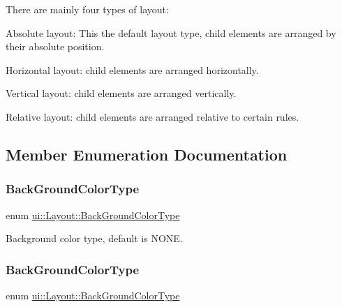 There are mainly four types of layout\+:
\begin{DoxyItemize}
\item Absolute layout\+: This the default layout type, child elements are arranged by their absolute position.
\item Horizontal layout\+: child elements are arranged horizontally.
\item Vertical layout\+: child elements are arranged vertically.
\item Relative layout\+: child elements are arranged relative to certain rules. 
\end{DoxyItemize}

\subsection{Member Enumeration Documentation}
\mbox{\label{classui_1_1Layout_a2aad69f15823c5f22d8ed72bf2ac7472}} 
\subsubsection{\texorpdfstring{Back\+Ground\+Color\+Type}{BackGroundColorType}\hspace{0.1cm}{\footnotesize\ttfamily [1/2]}}
{\footnotesize\ttfamily enum \hyperlink{classui_1_1Layout_a2aad69f15823c5f22d8ed72bf2ac7472}{ui\+::\+Layout\+::\+Back\+Ground\+Color\+Type}\hspace{0.3cm}{\ttfamily [strong]}}

Background color type, default is N\+O\+NE. \mbox{\label{classui_1_1Layout_a2aad69f15823c5f22d8ed72bf2ac7472}} 
\subsubsection{\texorpdfstring{Back\+Ground\+Color\+Type}{BackGroundColorType}\hspace{0.1cm}{\footnotesize\ttfamily [2/2]}}
{\footnotesize\ttfamily enum \hyperlink{classui_1_1Layout_a2aad69f15823c5f22d8ed72bf2ac7472}{ui\+::\+Layout\+::\+Back\+Ground\+Color\+Type}\hspace{0.3cm}{\ttfamily [strong]}}

